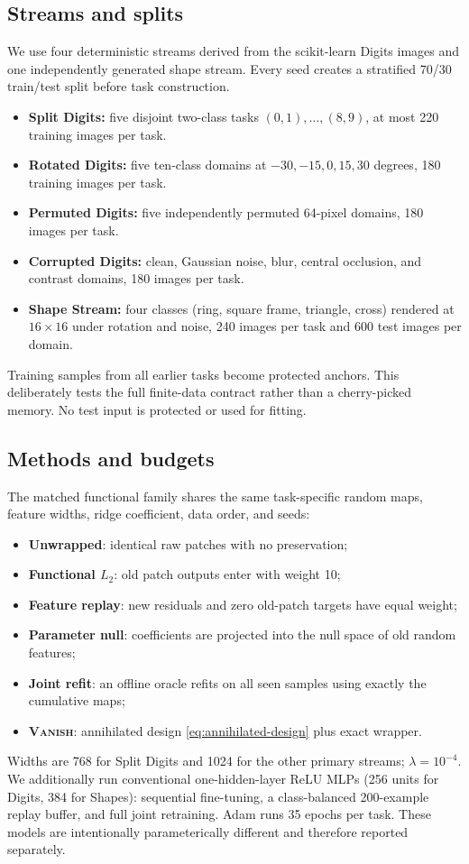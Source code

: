 \documentclass{vanish_ieee}
\theoremstyle{definition}
\newcommand{\VANISH}{\textsc{Vanish}}
\begin{document}
\subsection{Streams and splits}

We use four deterministic streams derived from the scikit-learn Digits images and one independently generated shape stream.  Every seed creates a stratified 70/30 train/test split before task construction.
\begin{itemize}
  \item \textbf{Split Digits:} five disjoint two-class tasks $(0,1),\ldots,(8,9)$, at most 220 training images per task.
  \item \textbf{Rotated Digits:} five ten-class domains at $-30,-15,0,15,30$ degrees, 180 training images per task.
  \item \textbf{Permuted Digits:} five independently permuted 64-pixel domains, 180 images per task.
  \item \textbf{Corrupted Digits:} clean, Gaussian noise, blur, central occlusion, and contrast domains, 180 images per task.
  \item \textbf{Shape Stream:} four classes (ring, square frame, triangle, cross) rendered at $16\times16$ under rotation and noise, 240 images per task and 600 test images per domain.
\end{itemize}
Training samples from all earlier tasks become protected anchors.  This deliberately tests the full finite-data contract rather than a cherry-picked memory.  No test input is protected or used for fitting.

\subsection{Methods and budgets}

The matched functional family shares the same task-specific random maps, feature widths, ridge coefficient, data order, and seeds:
\begin{itemize}
  \item \textbf{Unwrapped}: identical raw patches with no preservation;
  \item \textbf{Functional $L_2$}: old patch outputs enter with weight 10;
  \item \textbf{Feature replay}: new residuals and zero old-patch targets have equal weight;
  \item \textbf{Parameter null}: coefficients are projected into the null space of old random features;
  \item \textbf{Joint refit}: an offline oracle refits on all seen samples using exactly the cumulative maps;
  \item \textbf{\VANISH}: annihilated design \eqref{eq:annihilated-design} plus exact wrapper.
\end{itemize}
Widths are 768 for Split Digits and 1024 for the other primary streams; $\lambda=10^{-4}$.  We additionally run conventional one-hidden-layer ReLU MLPs (256 units for Digits, 384 for Shapes): sequential fine-tuning, a class-balanced 200-example replay buffer, and full joint retraining.  Adam runs 35 epochs per task.  These models are intentionally parameterically different and therefore reported separately.
\end{document}
